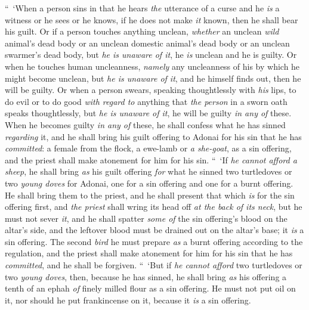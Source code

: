 \begin{biblechapter} %
 “ ‘When a person sins in that he hears \textit{the} utterance of a curse and he \textit{is} a witness or he sees or he knows, if he does not make \textit{it} known, then he shall bear his guilt.
\verse Or if a person touches anything unclean, \textit{whether} an unclean \textit{wild} animal’s dead body or an unclean domestic animal’s dead body or an unclean swarmer’s dead body, but \textit{he is unaware of it}, he \textit{is} unclean and he is guilty.
\verse Or when he touches human uncleanness, \textit{namely} any uncleanness of his by which he might become unclean, but \textit{he is unaware of it}, and he himself finds out, then he will be guilty.
\verse Or when a person swears, speaking thoughtlessly with \textit{his} lips, to do evil or to do good \textit{with regard to} anything that \textit{the person} in a sworn oath speaks thoughtlessly, but \textit{he is unaware of it}, he will be guilty \textit{in any of} these.
\verse When he becomes guilty \textit{in any of} these, he shall confess what he has sinned \textit{regarding} it,
\verse and he shall bring his guilt offering to Adonai for his sin that he has \textit{committed}: a female from the flock, a ewe-lamb or \textit{a she-goat}, as a sin offering, and the priest shall make atonement for him for his sin.
\verse “ ‘If \textit{he cannot afford a sheep}, he shall bring \textit{as} his guilt offering \textit{for} what he sinned two turtledoves or two \textit{young doves} for Adonai, one for a sin offering and one for a burnt offering.
\verse He shall bring them to the priest, and he shall present that which \textit{is} for the sin offering first, and \textit{the priest} shall wring its head off \textit{at the back of its neck}, but he must not sever \textit{it},
\verse and he shall spatter \textit{some of} the sin offering’s blood on the altar’s side, and the leftover blood must be drained out on the altar’s base; it \textit{is} a sin offering.
\verse The second \textit{bird} he must prepare \textit{as} a burnt offering according to the regulation, and the priest shall make atonement for him for his sin that he has \textit{committed}, and he shall be forgiven.
\verse “ ‘But if \textit{he cannot afford} two turtledoves or two \textit{young doves}, then, because he has sinned, he shall bring \textit{as} his offering a tenth of an ephah \textit{of} finely milled flour as a sin offering. He must not put oil on it, nor should he put frankincense on it, because it \textit{is} a sin offering.

\end{biblechapter}
